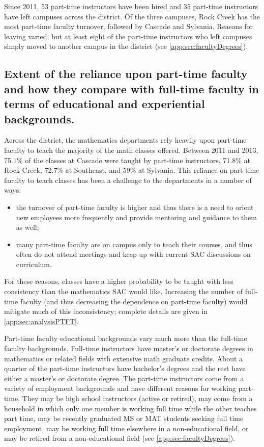 Since 2011, 53 part-time instructors have been hired and 35 part-time
instructors have left campuses across the district.  Of the three campuses,
Rock Creek has the most part-time faculty turnover, followed by Cascade and
Sylvania.  Reasons for leaving varied, but at least eight of the part-time
instructors who left campuses simply moved to another campus in the district
(see \vref{app:sec:facultyDegrees}).

\subsection[Part-time faculty]{Extent of the reliance upon part-time faculty and how they compare
with full-time faculty in terms of educational and experiential backgrounds.}
Across the district, the mathematics departments rely heavily upon part-time
faculty to teach the majority of the math classes offered.  Between 2011 and
2013, 75.1\% of the classes at Cascade were taught by part-time instructors,
71.8\% at Rock Creek, 72.7\% at Southeast, and 59\% at Sylvania.  This reliance
on part-time faculty to teach classes has been a challenge to the departments
in a number of ways:  
\begin{itemize}
\item the turnover of part-time faculty is higher and
thus there is a need to orient new employees more frequently and provide
mentoring and guidance to them as well;
\item many part-time faculty are on
campus only to teach their courses, and thus often do not attend meetings and
keep up with current SAC discussions on curriculum.  
\end{itemize}
For these reasons, classes have a higher probability to be taught with less consistency than the
mathematics SAC would like.  Increasing the number of full-time faculty (and
thus decreasing the dependence on part-time faculty) would mitigate much of
this inconsistency; complete details are given in  \vref{app:sec:analysisPTFT}.

Part-time faculty educational backgrounds vary much more than the full-time
faculty backgrounds.  Full-time instructors have master's or doctorate degrees
in mathematics or related fields with extensive math graduate credits.  About a
quarter of the part-time instructors have bachelor's degrees and the rest have
either a master's or doctorate degree.  The part-time instructors come from a
variety of employment backgrounds and have different reasons for working
part-time.  They may be high school instructors (active or retired), may come
from a household in which only one member is working full time while the other
teaches part time, may be recently graduated MS or MAT students seeking full
time employment, may be working full time elsewhere in a non-educational field,
or may be retired from a non-educational field (see
\vref{app:sec:facultyDegrees}).

